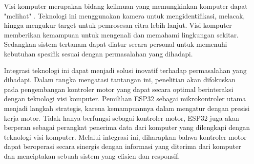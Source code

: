 Visi komputer merupakan bidang keilmuan yang memungkinkan komputer dapat "melihat" \cite{TIAN20201}. Teknologi ini menggunakan kamera untuk mengidentifikasi, melacak, hingga mengukur target untuk pemrosesan citra lebih lanjut. Visi komputer memberikan kemampuan untuk mengenali dan memahami lingkungan sekitar. Sedangkan sistem tertanam dapat diatur secara personal untuk memenuhi kebutuhan spesifik sesuai dengan permasalahan yang dihadapi. 

Integrasi teknologi ini dapat menjadi solusi inovatif terhadap permasalahan yang dihadapi. Dalam rangka mengatasi tantangan ini, penelitian akan difokuskan pada pengembangan kontroler motor yang dapat secara optimal berinteraksi dengan teknologi visi komputer. Pemilihan ESP32 sebagai mikrokontroler utama menjadi langkah strategis, karena kemampuannya dalam mengatur dengan presisi kerja motor. Tidak hanya berfungsi sebagai kontroler motor, ESP32 juga akan berperan sebagai perangkat penerima data dari komputer yang dilengkapi dengan teknologi visi komputer. Melalui integrasi ini, diharapkan bahwa kontroler motor dapat beroperasi secara sinergis dengan informasi yang diterima dari komputer dan menciptakan sebuah sistem yang efisien dan responsif.
